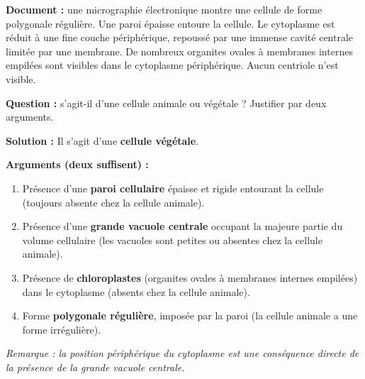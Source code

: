 \documentclass[11pt]{article}
\begin{document}
\begin{exoresolu}
\textbf{Document :} une micrographie électronique montre une cellule de forme polygonale régulière. Une paroi épaisse entoure la cellule. Le cytoplasme est réduit à une fine couche périphérique, repoussé par une immense cavité centrale limitée par une membrane. De nombreux organites ovales à membranes internes empilées sont visibles dans le cytoplasme périphérique. Aucun centriole n'est visible.

\textbf{Question :} s'agit-il d'une cellule animale ou végétale ? Justifier par deux arguments.

\tcblower

\textbf{Solution :}
Il s'agit d'une \textbf{cellule végétale}.

\textbf{Arguments (deux suffisent) :}
\begin{enumerate}
    \item Présence d'une \textbf{paroi cellulaire} épaisse et rigide entourant la cellule (toujours absente chez la cellule animale).
    \item Présence d'une \textbf{grande vacuole centrale} occupant la majeure partie du volume cellulaire (les vacuoles sont petites ou absentes chez la cellule animale).
    \item Présence de \textbf{chloroplastes} (organites ovales à membranes internes empilées) dans le cytoplasme (absents chez la cellule animale).
    \item Forme \textbf{polygonale régulière}, imposée par la paroi (la cellule animale a une forme irrégulière).
\end{enumerate}
\emph{Remarque : la position périphérique du cytoplasme est une conséquence directe de la présence de la grande vacuole centrale.}
\end{exoresolu}
\end{document}
